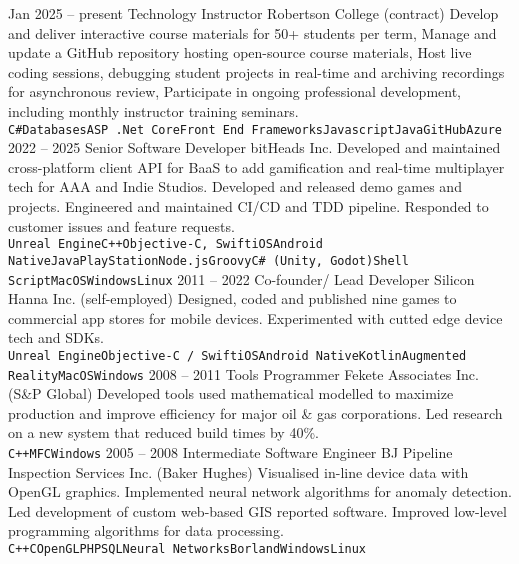 \documentclass[9pt]{developercv} %
\begin{document}
\begin{entrylist}
	\entry
		{Jan 2025 -- present}
		{Technology Instructor}
		{Robertson College (contract)}
		{Develop and deliver interactive course materials for 50+ students per term, Manage and update a GitHub repository hosting open-source course materials, Host live coding sessions, debugging student projects in real-time and archiving recordings for asynchronous review, Participate in ongoing professional development, including monthly instructor training seminars.\\ 
\texttt{C\#}\slashsep\texttt{Databases}\slashsep\texttt{ASP .Net Core}\slashsep\texttt{Front End Frameworks}\slashsep\texttt{Javascript}\slashsep\texttt{Java}\slashsep\texttt{GitHub}\slashsep\texttt{Azure}}
	\entry
		{2022 -- 2025}
		{Senior Software Developer}
		{bitHeads Inc.}
		{Developed and maintained cross-platform client API for BaaS to add gamification and real-time multiplayer tech for AAA and Indie Studios. Developed and released demo games and projects. Engineered and maintained CI/CD and TDD pipeline. Responded to customer issues and feature requests.\\ \texttt{Unreal Engine}\slashsep\texttt{C++}\slashsep\texttt{Objective-C, Swift}\slashsep\texttt{iOS}\slashsep\texttt{Android Native}\slashsep\texttt{Java}\slashsep\texttt{PlayStation}\slashsep\texttt{Node.js}\slashsep\texttt{Groovy}\slashsep\texttt{C\# (Unity, Godot)}\slashsep\texttt{Shell Script}\slashsep\texttt{MacOS}\slashsep\texttt{Windows}\slashsep\texttt{Linux}}
\entry
		{2011 -- 2022}
		{Co-founder/ Lead Developer}
		{Silicon Hanna Inc. (self-employed)}
		{Designed, coded and published nine games to commercial app stores for mobile devices. Experimented with cutted edge device tech and SDKs.\\ \texttt{Unreal Engine}\slashsep\texttt{Objective-C / Swift}\slashsep\texttt{iOS}\slashsep\texttt{Android Native}\slashsep\texttt{Kotlin}\slashsep\texttt{Augmented Reality}\slashsep\texttt{MacOS}\slashsep\texttt{Windows}}
	\entry
		{2008 -- 2011}
		{Tools Programmer}
		{Fekete Associates Inc. (S\&P Global)}
		{Developed tools used mathematical modelled to maximize production and improve efficiency for major oil \& gas corporations. Led research on a new system that reduced build times by 40\%. \\ \texttt{C++}\slashsep\texttt{MFC}\slashsep\texttt{Windows}}
	\entry
		{2005 -- 2008}
		{Intermediate Software Engineer}
		{BJ Pipeline Inspection Services Inc. (Baker Hughes)}
		{Visualised in-line device data with OpenGL graphics. Implemented neural network algorithms for anomaly detection. Led development of custom web-based GIS reported software. Improved low-level programming algorithms for data processing.\\ \texttt{C++}\slashsep\texttt{C}\slashsep\texttt{OpenGL}\slashsep\texttt{PHP}\slashsep\texttt{SQL}\slashsep\texttt{Neural Networks}\slashsep\texttt{Borland}\slashsep\texttt{Windows}\slashsep\texttt{Linux}}

\end{entrylist}
\end{document}
